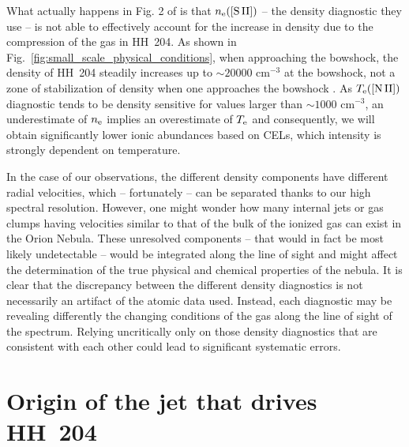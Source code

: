\documentclass[twocolumn]{aastex63}
\newcommand{\cesar}[1]{{\color{red}C: #1}}
\begin{document}
What actually happens in Fig. 2 of  \citet{odell17} is that $n_{\rm e}(\text{[S\thinspace II]})$ -- the density diagnostic they use -- is not able to effectively account for the increase in density due to the compression of the gas in HH~204. As shown in Fig.~\ref{fig:small_scale_physical_conditions}, when approaching the bowshock, the density of HH~204 steadily increases up to $\sim 20000 \text{ cm}^{-3}$ at the bowshock, not a zone of stabilization of density when one approaches the bowshock \citep[located around the value 3.2 on the x-axis of Fig.~2 from][]{odell17}. As $T_{\rm e}(\text{[N\thinspace II]})$ diagnostic tends to be density sensitive for values larger than $\sim 1000 \text{ cm}^{-3}$, an underestimate of $n_{\rm e}$ implies an overestimate of $T_{\rm e}$ and consequently, we will obtain significantly lower ionic abundances based on CELs, which intensity is strongly dependent on temperature.

In the case of our observations, the different density components have different radial velocities, which -- fortunately -- can be separated thanks to our high spectral resolution. However, one might wonder how many internal jets or gas clumps having velocities similar to that of the bulk of the ionized gas can exist in the Orion Nebula. These unresolved components -- that would in fact be most likely undetectable -- would be integrated along the line of sight and might affect the determination of the true physical and chemical properties of the nebula. It is clear that the discrepancy between the different density diagnostics is not necessarily an artifact of the atomic data used. Instead, each diagnostic may be revealing differently the changing conditions of the gas along the line of sight of the spectrum. Relying uncritically only on those density diagnostics that are consistent with each other could lead to significant systematic errors.  %


\section{Origin of the jet that drives HH~204}
\label{sec:origin-jet-that}
\end{document}
